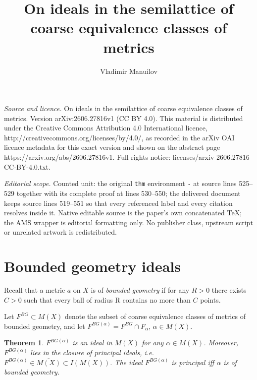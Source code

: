 \documentclass[10pt,a4paper]{amsart}
\newtheorem{thm}{Theorem}[section]
\numberwithin{equation}{section}
\begin{document}
\title[On ideals in the semilattice of coarse equivalence classes o]{On ideals in the semilattice of coarse equivalence classes of metrics}
\author{Vladimir Manuilov}
\date{}
\maketitle
\noindent\emph{Source and licence.} On ideals in the semilattice of coarse equivalence classes of metrics. Version arXiv:2606.27816v1 (CC BY 4.0). This material is distributed under the Creative Commons Attribution 4.0 International licence, http://creativecommons.org/licenses/by/4.0/, as recorded in the arXiv OAI licence metadata for this exact version and shown on the abstract page https://arxiv.org/abs/2606.27816v1. Full rights notice: licenses/arxiv-2606.27816-CC-BY-4.0.txt.\par\smallskip
\noindent\textit{Editorial scope.} Counted unit: the original \texttt{thm} environment \texttt{-} at source lines 525--529 together with its complete proof at lines 530--550; the delivered document keeps source lines 519--551 so that every referenced label and every citation resolves inside it. Native editable source is the paper's own concatenated TeX; the AMS wrapper is editorial formatting only. No publisher class, upstream script or unrelated artwork is redistributed.
\section{Bounded geometry ideals} 

Recall that a metric $a$ on $X$ is of \emph{bounded geometry} if for any $R>0$ there exists $C>0$ such that every ball of radius R contains no more than $C$ points.

Let $F^{BG}\subset M(X)$ denote the subset of coarse equivalence classes of metrics of bounded geometry, and let $F^{BG(\alpha)}=F^{BG}\cap F_\alpha$, $\alpha\in M(X)$.


\begin{thm}
$F^{BG(\alpha)}$ is an ideal in $M(X)$ for any $\alpha\in M(X)$. Moreover, $F^{BG(\alpha)}$ lies in the closure of principal ideals, i.e. $F^{BG(\alpha)}\in\overline{M(X)}\subset I(M(X))$.
The ideal $F^{BG(\alpha)}$ is principal iff $\alpha$ is of bounded geometry.

\end{thm}
\end{document}
